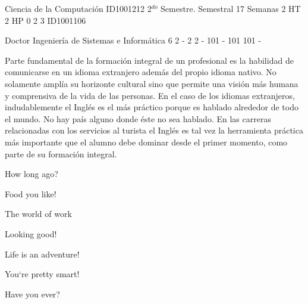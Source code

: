 \documentclass[a4paper,8pt]{article}
\begin{document}
\setNombreProfesor{}
\setGradoProfesorAbreviado{}
\sylabusHeader

\academicaTable
{Ciencia de la Computación} %
{ID1001212} %
{2$^{do}$ Semestre.} %
{Semestral} %
{17 Semanas} %
{2 HT} %
{2 HP} %
{0} %
{}  %
{2} %
{3} %
{ID1001106} %

\administrativaTable
{Doctor} %
{Ingeniería de Sistemas e Informática} %
{6} %
{2} %
{-} %
{2} %
{2} %
{-} %
{101} %
{-} %
{101} %
{101} %
{-} %


\begin{fundamentacion}
Parte fundamental de la formación integral de un profesional es la habilidad de 
comunicarse en un idioma extranjero además del propio idioma nativo. No solamente 
amplía su horizonte cultural sino que permite una visión más humana y comprensiva 
de la vida de las personas. En el caso de los idiomas extranjeros, indudablemente 
el Inglés es el más práctico porque es hablado alrededor de todo el mundo. No hay 
país alguno donde éste no sea hablado. En las carreras relacionadas con los 
servicios al turista el Inglés es tal vez la herramienta práctica más importante 
que el alumno debe dominar desde el primer momento, como parte de su formación 
integral.

\end{fundamentacion}

\begin{sumilla}
\item How long ago?
\item Food you like!
\item The world of work
\item Looking good!
\item Life is an adventure!
\item You`re pretty smart!
\item Have you ever?

\end{sumilla}
\end{document}
